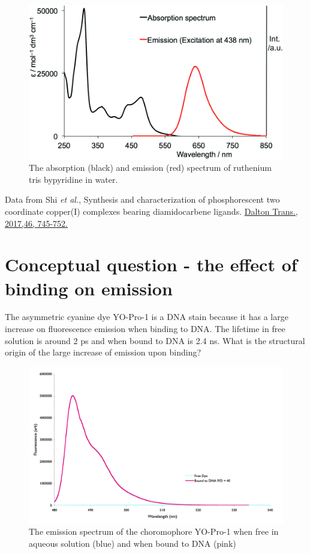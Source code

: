 \documentclass[
]{book}
\begin{document}
\begin{figure}

{\centering \includegraphics[width=0.7\linewidth]{images/Rubpy3spectra} 

}

\caption{The absorption (black) and emission (red) spectrum of ruthenium tris bypyridine in water.}\label{fig:Rubpyspec}
\end{figure}

Data from Shi \emph{et al.}, Synthesis and characterization of phosphorescent two coordinate copper(I) complexes bearing diamidocarbene ligands. \href{https://doi.org/10.1039/C6DT04016K}{Dalton Trans., 2017,46, 745-752.}

\hypertarget{sec:binding}{%
\section{Conceptual question - the effect of binding on emission}\label{sec:binding}}

The asymmetric cyanine dye YO-Pro-1 is a DNA stain because it has a large increase on fluorescence emission when binding to DNA. The lifetime in free solution is around 2 ps and when bound to DNA is 2.4 ns. What is the structural origin of the large increase of emission upon binding?

\begin{figure}

{\centering \includegraphics[width=0.7\linewidth]{images/YODNA} 

}

\caption{The emission spectrum of the choromophore YO-Pro-1 when free in aqueous solution (blue) and when bound to DNA (pink)}\label{fig:YODNA}
\end{figure}
\end{document}

